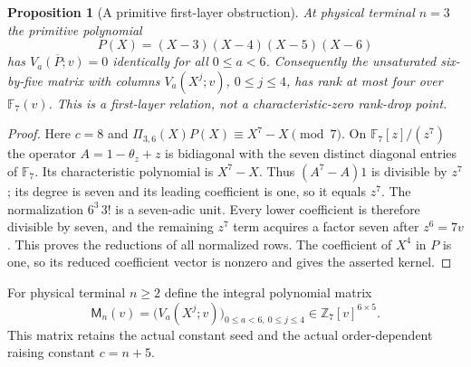 \documentclass[11pt]{article}
\newtheorem{proposition}[lemma]{Proposition}
\begin{document}
\begin{proposition}[A primitive first-layer obstruction]
\label{prop:first-layer-obstruction}
At physical terminal $n=3$ the primitive polynomial
\[
 P(X)=(X-3)(X-4)(X-5)(X-6)
\]
has $\overline{V_a(P;v)}=0$ identically for all $0\le a<6$.
Consequently the unsaturated six-by-five matrix with columns
$V_a(X^j;v)$, $0\le j\le4$, has rank at most four over
$\mathbb F_7(v)$. This is a first-layer relation, not a
characteristic-zero rank-drop point.
\end{proposition}
\begin{proof}
Here $c=8$ and
$\Pi_{3,6}(X)P(X)\equiv X^7-X\pmod7$.
On $\mathbb F_7[z]/(z^7)$ the operator $A=1-\theta_z+z$ is
bidiagonal with the seven distinct diagonal entries of $\mathbb F_7$.
Its characteristic polynomial is $X^7-X$.
Thus $(A^7-A)1$ is divisible by $z^7$; its degree is seven and
its leading coefficient is one, so it equals $z^7$.
The normalization $6^3\,3!$ is a seven-adic unit.
Every lower coefficient is therefore divisible by seven, and the
remaining $z^7$ term acquires a factor seven after $z^6=7v$.
This proves the reductions of all normalized rows.
The coefficient of $X^4$ in $P$ is one, so its reduced coefficient
vector is nonzero and gives the asserted kernel.
\end{proof}

For physical terminal $n\ge2$ define the integral polynomial matrix
\[
 \mathsf M_n(v)=\bigl(V_a(X^j;v)\bigr)_
                    {0\le a<6,\ 0\le j\le4}\in
                         \mathbb Z_7[v]^{6\times5}.       \tag{6}
\]
This matrix retains the actual constant seed and the actual
order-dependent raising constant $c=n+5$.
\end{document}
